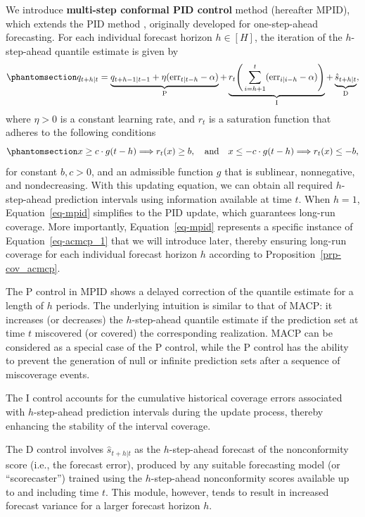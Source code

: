 \documentclass[
  11pt,
  a4paper,
]{article}
\theoremstyle{plain}
\theoremstyle{remark}
\begin{document}
We introduce \textbf{multi-step conformal PID control} method (hereafter
MPID), which extends the PID method \autocite{angelopoulos2024},
originally developed for one-step-ahead forecasting. For each individual
forecast horizon \(h\in[H]\), the iteration of the \(h\)-step-ahead
quantile estimate is given by
\begin{equation}\phantomsection\label{eq-mpid}{
q_{t+h|t}=\underbrace{q_{t+h-1|t-1}+\eta (\mathrm{err}_{t|t-h}-\alpha)}_{\mathrm{P}}+\underbrace{r_t\Bigg(\sum_{i=h+1}^t (\mathrm{err}_{i|i-h}-\alpha)\Bigg)}_{\mathrm{I}}+\underbrace{\hat{s}_{t+h|t}}_{\mathrm{D}},
}\end{equation} where \(\eta > 0\) is a constant learning rate, and
\(r_t\) is a saturation function that adheres to the following
conditions\pagebreak[1]\begin{equation}\phantomsection\label{eq-saturation_h}{
x \geq c \cdot g(t-h) \Longrightarrow r_t(x) \geq b, \quad \text {and} \quad x \leq-c \cdot g(t-h) \Longrightarrow r_t(x) \leq -b,
}\end{equation} for constant \(b, c > 0\), and an admissible function
\(g\) that is sublinear, nonnegative, and nondecreasing. With this
updating equation, we can obtain all required \(h\)-step-ahead
prediction intervals using information available at time \(t\). When
\(h=1\), Equation~\ref{eq-mpid} simplifies to the PID update, which
guarantees long-run coverage. More importantly, Equation~\ref{eq-mpid}
represents a specific instance of Equation~\ref{eq-acmcp_1} that we will
introduce later, thereby ensuring long-run coverage for each individual
forecast horizon \(h\) according to Proposition~\ref{prp-cov_acmcp}.

The P control in MPID shows a delayed correction of the quantile
estimate for a length of \(h\) periods. The underlying intuition is
similar to that of MACP: it increases (or decreases) the
\(h\)-step-ahead quantile estimate if the prediction set at time \(t\)
miscovered (or covered) the corresponding realization. MACP can be
considered as a special case of the P control, while the P control has
the ability to prevent the generation of null or infinite prediction
sets after a sequence of miscoverage events.

The I control accounts for the cumulative historical coverage errors
associated with \(h\)-step-ahead prediction intervals during the update
process, thereby enhancing the stability of the interval coverage.

The D control involves \(\hat{s}_{t+h|t}\) as the \(h\)-step-ahead
forecast of the nonconformity score (i.e., the forecast error), produced
by any suitable forecasting model (or ``scorecaster'') trained using the
\(h\)-step-ahead nonconformity scores available up to and including time
\(t\). This module, however, tends to result in increased forecast
variance for a larger forecast horizon
\(h\).
\end{document}

